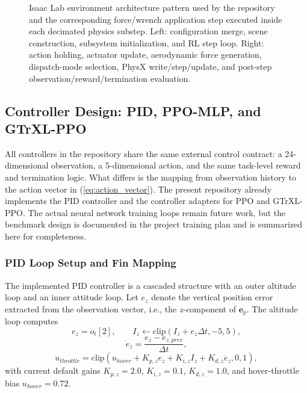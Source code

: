 \documentclass[10pt,twocolumn]{article}
\begin{document}
\begin{figure}[!t]
\begin{minipage}[t]{0.48\textwidth}
\end{minipage}
\caption{Isaac Lab environment architecture pattern used by the repository and the corresponding force/wrench application step executed inside each decimated physics substep. Left: configuration merge, scene construction, subsystem initialization, and RL step loop. Right: action holding, actuator update, aerodynamic force generation, dispatch-mode selection, PhysX write/step/update, and post-step observation/reward/termination evaluation.}
\label{fig:isaac_arch_pattern}
\end{figure}

\subsection{Controller Design: PID, PPO-MLP, and GTrXL-PPO}

All controllers in the repository share the same external control contract: a 24-dimensional observation, a 5-dimensional action, and the same task-level reward and termination logic. What differs is the mapping from observation history to the action vector in (\ref{eq:action_vector}). The present repository already implements the PID controller and the controller adapters for PPO and GTrXL-PPO. The actual neural network training loops remain future work, but the benchmark design is documented in the project training plan and is summarized here for completeness.

\subsubsection{PID Loop Setup and Fin Mapping}

The implemented PID controller is a cascaded structure with an outer altitude loop and an inner attitude loop. Let $e_z$ denote the vertical position error extracted from the observation vector, i.e., the $z$-component of $\mathbf{e}_p$. The altitude loop computes
\begin{equation}
e_z = o_t[2],
\qquad
I_z \leftarrow \mathrm{clip}(I_z + e_z \Delta t,-5,5),
\label{eq:pid_alt_int}
\end{equation}
\begin{equation}
\dot{e}_z = \frac{e_z - e_{z,prev}}{\Delta t},
\label{eq:pid_alt_deriv}
\end{equation}
\begin{equation}
u_{throttle} =
\mathrm{clip}\left(
u_{hover} + K_{p,z}e_z + K_{i,z}I_z + K_{d,z}\dot{e}_z,
0,1
\right),
\label{eq:pid_throttle}
\end{equation}
with current default gains $K_{p,z}=2.0$, $K_{i,z}=0.1$, $K_{d,z}=1.0$, and hover-throttle bias $u_{hover}=0.72$.
\end{document}
